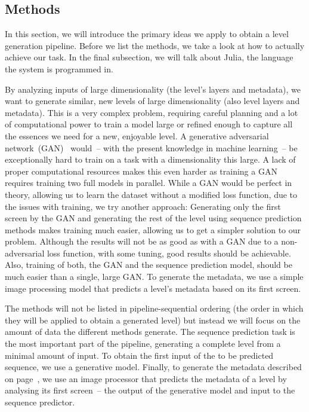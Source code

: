 \subsection{Methods}
\label{sec:methods}

In this section, we will introduce the primary ideas we apply to
obtain a level generation pipeline. Before we list the methods, we
take a look at how to actually achieve our task. In the final
subsection, we will talk about Julia, the language the system is
programmed in.

By analyzing inputs of large dimensionality (the level's layers and
metadata), we want to generate similar, new levels of large
dimensionality (also level layers and metadata). This is a very
complex problem, requiring careful planning and a lot of computational
power to train a model large or refined enough to capture all the
essences we need for a new, enjoyable level. A generative adversarial
network~(GAN)~\cite{goodfellowGenerativeAdversarialNetworks2014}
would~-- with the present knowledge in machine learning~-- be
exceptionally hard to train on a task with a dimensionality this
large. A lack of proper computational resources makes this even harder
as training a GAN requires training two full models in parallel. While
a GAN would be perfect in theory, allowing us to learn the dataset
without a modified loss function, due to the issues with training, we
try another approach: Generating only the first screen by the GAN and
generating the rest of the level using sequence prediction methods
makes training much easier, allowing us to get a simpler solution to
our problem. Although the results will not be as good as with a GAN
due to a non-adversarial loss function, with some tuning, good results
should be achievable. Also, training of both, the GAN and the sequence
prediction model, should be much easier than a single, large GAN. To
generate the metadata, we use a simple image processing model that
predicts a level's metadata based on its first screen.

The methods will not be listed in pipeline-sequential ordering (the
order in which they will be applied to obtain a generated level) but
instead we will focus on the amount of data the different methods
generate. The sequence prediction task is the most important part of
the pipeline, generating a complete level from a minimal amount of
input. To obtain the first input of the to be predicted sequence, we
use a generative model. Finally, to generate the metadata described on
page~\pageref{par:metadata}, we use an image processor that predicts
the metadata of a level by analysing its first screen~-- the output of
the generative model and input to the sequence predictor.

